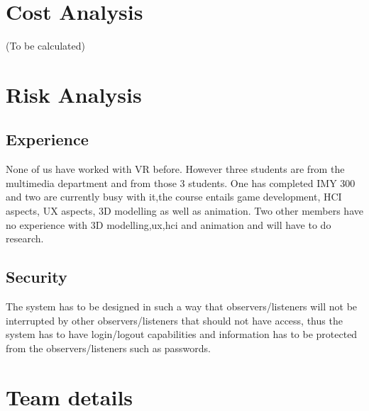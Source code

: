 \documentclass{article}
\begin{document}
\section{Cost Analysis}
(To be calculated)


\section{Risk Analysis}
\subsection{Experience}
None of us have worked with VR before. However three students are from the multimedia department and from those 3 students. One has completed IMY 300 and two are currently busy with it,the course entails game development, HCI aspects, UX aspects, 3D modelling as well as animation. Two other members have no experience  with 3D modelling,ux,hci and animation and will have to do research.


\subsection{Security}
The system has to be designed in such a way that observers/listeners will not be interrupted by other observers/listeners that should not have access, thus the system has to have login/logout capabilities and information has to be protected from the observers/listeners such as passwords.

\section{Team details}
\end{document}

